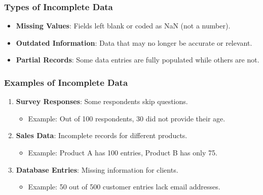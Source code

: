 \documentclass[aspectratio=169]{beamer}
\begin{document}
\begin{frame}[fragile]
    \frametitle{Types of Incomplete Data}
    \begin{itemize}
        \item \textbf{Missing Values}: Fields left blank or coded as NaN (not a number).
        \item \textbf{Outdated Information}: Data that may no longer be accurate or relevant.
        \item \textbf{Partial Records}: Some data entries are fully populated while others are not.
    \end{itemize}
\end{frame}

\begin{frame}[fragile]
    \frametitle{Examples of Incomplete Data}
    \begin{enumerate}
        \item \textbf{Survey Responses}: Some respondents skip questions.
              \begin{itemize}
                  \item Example: Out of 100 respondents, 30 did not provide their age.
              \end{itemize}
        
        \item \textbf{Sales Data}: Incomplete records for different products.
              \begin{itemize}
                  \item Example: Product A has 100 entries, Product B has only 75.
              \end{itemize}

        \item \textbf{Database Entries}: Missing information for clients.
              \begin{itemize}
                  \item Example: 50 out of 500 customer entries lack email addresses.
              \end{itemize}
    \end{enumerate}
\end{frame}
\end{document}
